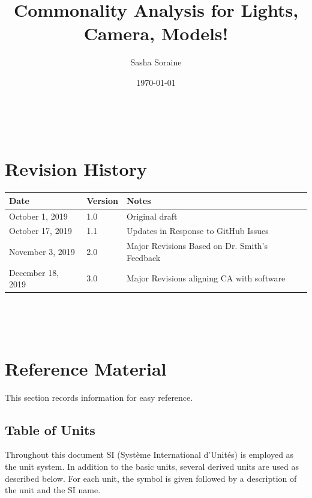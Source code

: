 \documentclass[12pt]{article}
\newcommand{\famname}{Lights, Camera, Models!} %
\begin{document}
\label{doc:CA}

\title{Commonality Analysis for \famname}
\author{Sasha Soraine}
\date{\today}

\maketitle

~\newpage


\section{Revision History}

\begin{tabularx}{\textwidth}{p{3cm}p{2cm}X}
\toprule {\bf Date} & {\bf Version} & {\bf Notes}\\
\midrule
October 1, 2019 & 1.0 & Original draft\\
October 17, 2019 & 1.1 & Updates in Response to GitHub Issues \\
November 3, 2019 & 2.0 & Major Revisions Based on Dr. Smith's Feedback\\
December 18, 2019 & 3.0 & Major Revisions aligning CA with software\\
\bottomrule
\end{tabularx}

~\newpage
	
\tableofcontents

~\newpage



\section{Reference Material}

This section records information for easy reference.

\subsection{Table of Units}

Throughout this document SI (Syst\`{e}me International d'Unit\'{e}s) is employed
as the unit system.  In addition to the basic units, several derived units are
used as described below.  For each unit, the symbol is given followed by a
description of the unit and the SI name.
~\newline
\end{document}
